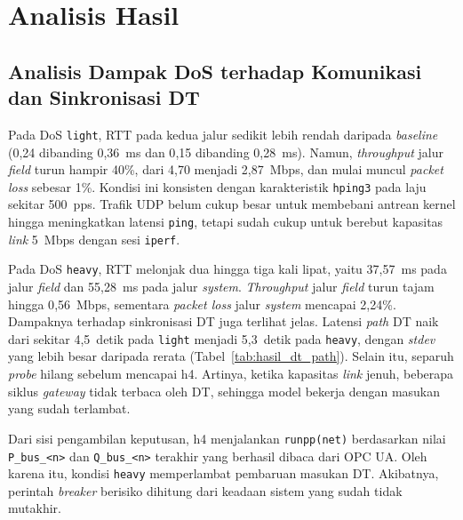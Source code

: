 \section{Analisis Hasil}
\label{sec:analisis_hasil}

\subsection{Analisis Dampak DoS terhadap Komunikasi dan Sinkronisasi DT}
\label{subsec:analisis_dampak_dos}
Pada \ac{DoS} \texttt{light}, RTT pada kedua jalur sedikit lebih rendah daripada \textit{baseline} (0{,}24 dibanding 0{,}36~ms dan 0{,}15 dibanding 0{,}28~ms). Namun, \textit{throughput} jalur \textit{field} turun hampir 40\%, dari 4{,}70 menjadi 2{,}87~Mbps, dan mulai muncul \textit{packet loss} sebesar 1\%. Kondisi ini konsisten dengan karakteristik \texttt{hping3} pada laju sekitar 500~pps. Trafik UDP belum cukup besar untuk membebani antrean kernel hingga meningkatkan latensi \texttt{ping}, tetapi sudah cukup untuk berebut kapasitas \textit{link} 5~Mbps dengan sesi \texttt{iperf}. 

Pada \ac{DoS} \texttt{heavy}, RTT melonjak dua hingga tiga kali lipat, yaitu 37{,}57~ms pada jalur \textit{field} dan 55{,}28~ms pada jalur \textit{system}. \textit{Throughput} jalur \textit{field} turun tajam hingga 0{,}56~Mbps, sementara \textit{packet loss} jalur \textit{system} mencapai 2{,}24\%. Dampaknya terhadap sinkronisasi \ac{DT} juga terlihat jelas. Latensi \textit{path} \ac{DT} naik dari sekitar 4{,}5~detik pada \texttt{light} menjadi 5{,}3~detik pada \texttt{heavy}, dengan \textit{stdev} yang lebih besar daripada rerata (Tabel~\ref{tab:hasil_dt_path}). Selain itu, separuh \textit{probe} hilang sebelum mencapai h4. Artinya, ketika kapasitas \textit{link} jenuh, beberapa siklus \textit{gateway} tidak terbaca oleh \ac{DT}, sehingga model bekerja dengan masukan yang sudah terlambat.

Dari sisi pengambilan keputusan, h4 menjalankan \texttt{runpp(net)} berdasarkan nilai \texttt{P\_bus\_<n>} dan \texttt{Q\_bus\_<n>} terakhir yang berhasil dibaca dari OPC UA. Oleh karena itu, kondisi \texttt{heavy} memperlambat pembaruan masukan \ac{DT}. Akibatnya, perintah \textit{breaker} berisiko dihitung dari keadaan sistem yang sudah tidak mutakhir.

